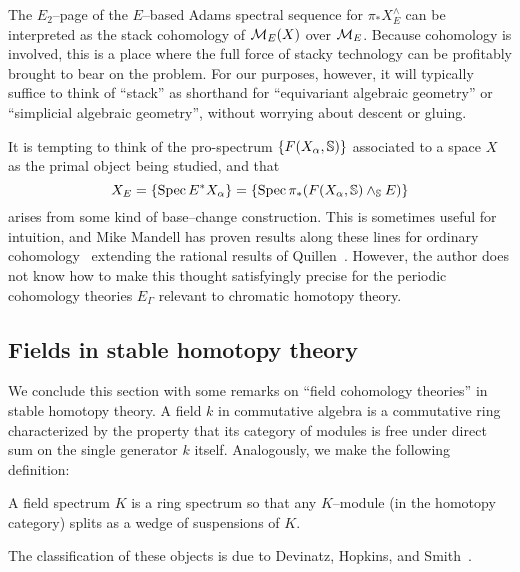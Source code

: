 \begin{remark}\label{AdamsSSeqAndStackCoh}
The $E_2$--page of the $E$--based Adams spectral sequence for $\pi_* X^\wedge_E$ can be interpreted as the stack cohomology of $\sheaf{M}_E(X)$ over $\sheaf{M}_E$.  Because cohomology is involved, this is a place where the full force of stacky technology can be profitably brought to bear on the problem.  For our purposes, however, it will typically suffice to think of ``stack'' as shorthand for ``equivariant algebraic geometry'' or ``simplicial algebraic geometry'', without worrying about descent or gluing.
\end{remark}

\begin{remark}\label{DeeperBaseRemark}
It is tempting to think of the pro-spectrum $\{F(X_\alpha, \S)\}$ associated to a space $X$ as the primal object being studied, and that \[X_E = \{\Spec E^* X_\alpha\} = \{\Spec \pi_* (F(X_\alpha, \S) \sm_{\S} E)\}\] arises from some kind of base--change construction.  This is sometimes useful for intuition, and Mike Mandell has proven results along these lines for ordinary cohomology~\cite{MandellHZCochains,MandellHFpCochains} extending the rational results of Quillen~\cite{QuillenRational}.  However, the author does not know how to make this thought satisfyingly precise for the periodic cohomology theories $E_\Gamma$ relevant to chromatic homotopy theory.
\end{remark}



\subsection{Fields in stable homotopy theory}

We conclude this section with some remarks on ``field cohomology theories'' in stable homotopy theory.  A field $k$ in commutative algebra is a commutative ring characterized by the property that its category of modules is free under direct sum on the single generator $k$ itself.  Analogously, we make the following definition:

\begin{definition}
A field spectrum $K$ is a ring spectrum so that any $K$--module (in the homotopy category) splits as a wedge of suspensions of $K$.
\end{definition}

The classification of these objects is due to Devinatz, Hopkins, and Smith~\cite{HopkinsSmith}.

